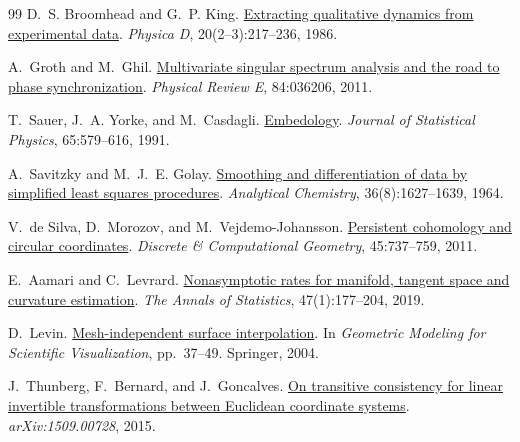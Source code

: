 \documentclass[11pt,a4paper]{article}
\begin{document}
\endgroup
\clearpage
\begin{thebibliography}{99}
\small
\setlength{\itemsep}{4pt}
\setlength{\parskip}{0pt}
D.~S. Broomhead and G.~P. King.
\href{https://alterlab.org/teaching/BME6770/papers\%2Bpatents\%2Breports/Broomhead_1986.pdf}{Extracting qualitative dynamics from experimental data}.
\emph{Physica D}, 20(2--3):217--236, 1986.

A.~Groth and M.~Ghil.
\href{https://link.aps.org/accepted/10.1103/PhysRevE.84.036206}{Multivariate singular spectrum analysis and the road to phase synchronization}.
\emph{Physical Review E}, 84:036206, 2011.

T.~Sauer, J.~A. Yorke, and M.~Casdagli.
\href{https://sfi-edu.s3.amazonaws.com/sfi-edu/production/uploads/sfi-com/dev/uploads/filer/ab/72/ab72ea70-def1-468c-bb30-7174d2bcdc33/91-01-008.pdf}{Embedology}.
\emph{Journal of Statistical Physics}, 65:579--616, 1991.

A.~Savitzky and M.~J.~E. Golay.
\href{https://ntrs.nasa.gov/api/citations/19700027052/downloads/19700027052.pdf\#page=90}{Smoothing and differentiation of data by simplified least squares procedures}.
\emph{Analytical Chemistry}, 36(8):1627--1639, 1964.

V.~de Silva, D.~Morozov, and M.~Vejdemo-Johansson.
\href{https://link.springer.com/content/pdf/10.1007/s00454-011-9344-x.pdf}{Persistent cohomology and circular coordinates}.
\emph{Discrete \& Computational Geometry}, 45:737--759, 2011.

E.~Aamari and C.~Levrard.
\href{https://www.normalesup.org/~levrard/Non_asymptotic_rates_for_manifold_TS_and_curvature_estimation.pdf}{Nonasymptotic rates for manifold, tangent space and curvature estimation}.
\emph{The Annals of Statistics}, 47(1):177--204, 2019.

D.~Levin.
\href{https://www.tau.ac.il/~levin/mls03cor.pdf}{Mesh-independent surface interpolation}.
In \emph{Geometric Modeling for Scientific Visualization}, pp.~37--49.
Springer, 2004.

J.~Thunberg, F.~Bernard, and J.~Goncalves.
\href{https://arxiv.org/pdf/1509.00728}{On transitive consistency for linear invertible transformations between
Euclidean coordinate systems}.
\emph{arXiv:1509.00728}, 2015.


\end{thebibliography}
\end{document}
